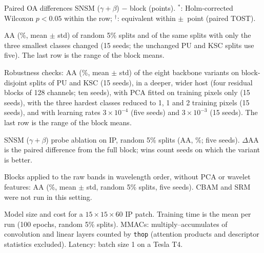 \documentclass[11pt]{article}
\begin{document}
\begin{table}[h]
\centering
\caption{Paired OA differences SNSM ($\gamma{+}\beta$) $-$ block (points). $^{*}$: Holm-corrected Wilcoxon $p<0.05$ within the row; $^{\dagger}$: equivalent within $\pm$\margin\ point (paired TOST).}
\resizebox{\textwidth}{!}{}
\end{table}

\begin{table}[h]
\centering
\caption{AA (\%, mean $\pm$ std) of random 5\% splits and of the same splits with only the three smallest classes changed (15 seeds; the unchanged PU and KSC splits use five). The last row is the range of the block means.}
\resizebox{\textwidth}{!}{}
\end{table}

\begin{table}[h]
\centering
\caption{Robustness checks: AA (\%, mean $\pm$ std) of the eight backbone variants on block-disjoint splits of PU and KSC (15 seeds), in a deeper, wider host (four residual blocks of 128 channels; ten seeds), with PCA fitted on training pixels only (15 seeds), with the three hardest classes reduced to 1, 1 and 2 training pixels (15 seeds), and with learning rates $3\times10^{-4}$ (five seeds) and $3\times10^{-3}$ (15 seeds). The last row is the range of the block means.}
\resizebox{\textwidth}{!}{}
\end{table}

\begin{table}[h]
\centering
\caption{SNSM ($\gamma{+}\beta$) probe ablation on IP, random 5\% splits (AA, \%; five seeds). $\Delta$AA is the paired difference from the full block; wins count seeds on which the variant is better.}

\end{table}

\begin{table}[h]
\centering
\caption{Blocks applied to the raw bands in wavelength order, without PCA or wavelet features: AA (\%, mean $\pm$ std, random 5\% splits, five seeds). CBAM and SRM were not run in this setting.}

\end{table}

\begin{table}[h]
\centering
\caption{Model size and cost for a $15\times15\times60$ IP patch. Training time is the mean per run (100 epochs, random 5\% splits). MMACs: multiply--accumulates of convolution and linear layers counted by \texttt{thop} (attention products and descriptor statistics excluded). Latency: batch size 1 on a Tesla T4.}

\end{table}
\end{document}
